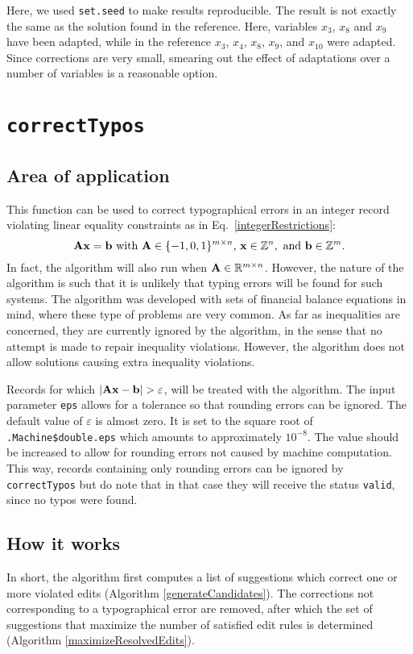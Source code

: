 \documentclass[11pt, fleqn, a4paper]{article}
\begin{document}
Here, we used {\tt set.seed} to make results reproducible. The result is not
exactly the same as the solution found in the reference. Here, variables $x_3$,
$x_8$ and $x_9$ have been adapted, while in the reference $x_3$, $x_4$, $x_8$, 
$x_9$, and $x_{10}$ were adapted.  Since corrections are very small, smearing out the
effect of adaptations over a number of variables is a reasonable option.

%
%
%
\section{\tt correctTypos}
\label{typingErrors}
%
\subsection{Area of application}
This function can be used to correct typographical errors in an integer record
violating linear equality constraints as in Eq.\ \eqref{integerRestrictions}:
\begin{displaymath}
{\bf Ax} = {\bf b} \textrm{ with } {\bf A}\in \{-1,0,1\}^{m\times n}\textrm{, } {\bf x}\in \mathbb{Z}^{n},\textrm{ and } {\bf b}\in\mathbb{Z}^m.
\end{displaymath}
In fact, the algorithm will also run when ${\bf A}\in \mathbb{R}^{m\times n}$.
However, the nature of the algorithm is such that it is unlikely that typing
errors will be found for such systems.  The algorithm was developed with sets
of financial balance equations in mind, where these type of problems are very
common. As far as inequalities are concerned, they are currently ignored by the
algorithm, in the sense that no attempt is made to repair inequality
violations. However, the algorithm does not allow solutions causing extra
inequality violations.

Records for which $|{\bf Ax-b}|>\varepsilon$, will be treated with the algorithm.  The
input parameter {\tt eps} allows for a tolerance so that rounding errors can be
ignored. The default value of $\varepsilon$ is almost zero. It is set to the square
root of {\tt .Machine\$double.eps} which amounts to approximately $10^{-8}$.
The value should be increased to allow for rounding errors not caused by
machine computation. This way, records containing only rounding errors can be
ignored by {\tt correctTypos} but do note that in that case they will receive
the status {\tt valid}, since no typos were found.

\subsection{How it works}
In short, the algorithm first computes a list of suggestions which correct one
or more violated edits (Algorithm \ref{generateCandidates}). The corrections
not corresponding to a typographical error are removed, after which  the set of
suggestions that maximize the number of satisfied edit rules is determined
(Algorithm \ref{maximizeResolvedEdits}). 
\end{document}
